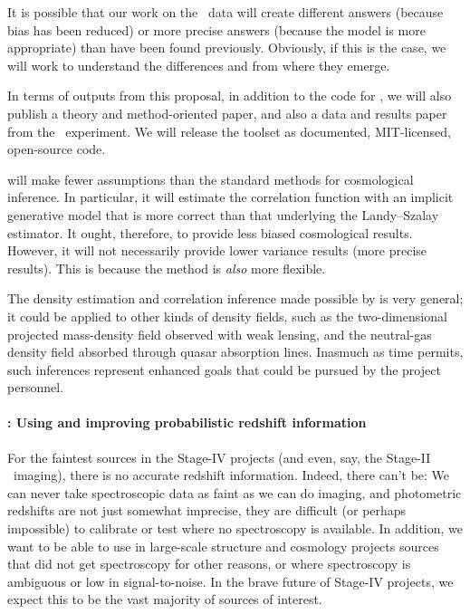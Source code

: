 \documentclass[12pt]{article}
\begin{document}
It is possible that our work on the \boss\ data will create
different answers (because bias has been reduced) or more precise
answers (because the model is more appropriate) than have been found
previously.
Obviously, if this is the case, we will work to understand the
differences and from where they emerge.

In terms of outputs from this proposal, in addition to the code for
, we will also publish a theory and method-oriented
paper, and also a data and results paper from the \boss\ experiment.
We will release the toolset as documented, MIT-licensed, open-source
code.

 will make fewer assumptions than the standard
methods for cosmological inference.
In particular, it will estimate the correlation function with an
implicit generative model that is more correct than that underlying
the Landy--Szalay estimator.
It ought, therefore, to provide less biased cosmological results.
However, it will not necessarily provide lower variance results (more
precise results).
This is because the method is \emph{also} more flexible.

The density estimation and correlation inference made possible by
 is very general; it could be applied to other
kinds of density fields, such as the two-dimensional projected
mass-density field observed with weak lensing, and the neutral-gas
density field absorbed through quasar absorption lines.
Inasmuch as time permits, such inferences represent enhanced goals
that could be pursued by the project personnel.

\paragraph{: Using and improving probabilistic redshift information}

For the faintest sources in the Stage-IV projects (and even, say, the
Stage-II \sdss\ imaging), there is no accurate redshift information.
Indeed, there can't be:
We can never take spectroscopic data as faint as we can do imaging,
and photometric redshifts are not just somewhat imprecise, they are
difficult (or perhaps impossible) to calibrate or test where no
spectroscopy is available.
In addition, we want to be able to use in large-scale structure and
cosmology projects sources that did not get spectroscopy for other
reasons, or where spectroscopy is ambiguous or low in signal-to-noise.
In the brave future of Stage-IV projects, we expect this to be the
vast majority of sources of interest.
\end{document}
